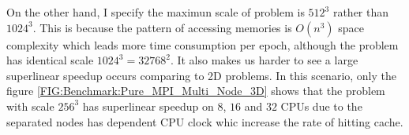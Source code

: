 On the other hand, I specify the maximun scale of problem is $512^3$ rather than $1024^3$. 
This is because the pattern of accessing memories is $O(n^3)$ space complexity which leads more time consumption per epoch, 
although the problem has identical scale $1024^3 = 32768^2$. 
It also makes us harder to see a large superlinear speedup occurs comparing to 2D problems.
In this scenario, only the figure \ref{FIG:Benchmark:Pure_MPI_Multi_Node_3D} shows that the problem with scale $256^3$ has 
superlinear speedup on $8$, $16$ and $32$ CPUs due to the separated nodes has dependent CPU clock whic increase the rate of hitting cache.
\begin{figure}[htbp]
  \centering
  \hspace{0em} 
  \hspace{0em} 
\end{figure}
